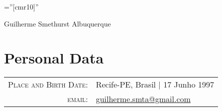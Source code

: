 \documentclass[a4paper,10pt]{article}
\begin{document}
\pagestyle{empty} %

\font\fb=''[cmr10]'' %

\par{\centering
		{\Huge Guilherme Smethurst Albuquerque
	}\bigskip\par}

\section{Personal Data}

\begin{tabular}{rl}
    \textsc{Place and Birth Date:} & Recife-PE, Brasil  | 17 Junho 1997 \\
    \textsc{email:}     &  \href{mailto:guilherme.smta@gmail.com}{guilherme.smta@gmail.com}
\end{tabular}

\end{document}

